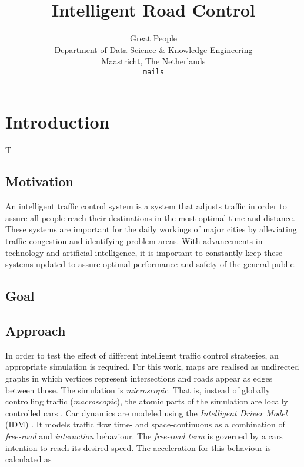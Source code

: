 \documentclass[10pt]{article}
\title{Intelligent Road Control}
\author{Great People \\
	Department of Data Science \& Knowledge Engineering\\
	Maastricht, The Netherlands\\
	{\tt mails}
  }
\begin{document}
\maketitle

\begin{abstract}
	
\end{abstract}

\section{Introduction}
T

\subsection{Motivation}
An intelligent traffic control system is a system that adjusts traffic in order to assure all people reach their destinations in the most optimal time and distance.  These systems are important for the daily workings of major cities by alleviating traffic congestion and identifying problem areas.  With advancements in technology and artificial intelligence, it is important to constantly keep these systems updated to assure optimal performance and safety of the general public.

\subsection{Goal}

\subsection{Approach}
In order to test the effect of different intelligent traffic control strategies, an appropriate simulation is required. For this work, maps are realised as undirected graphs in which vertices represent intersections and roads appear as edges between those. The simulation is \textit{microscopic}. That is, instead of globally controlling traffic (\textit{macroscopic}), the atomic parts of the simulation are locally controlled cars \citep[see also][]{krajzewicz2002sumo}. Car dynamics are modeled using the \textit{Intelligent Driver Model} (IDM) \citep{treiber2000congested}. It models traffic flow time- and space-continuous as a combination of \textit{free-road} and \textit{interaction} behaviour. The \textit{free-road term} is governed by a cars intention to reach its desired speed. The acceleration for this behaviour is calculated \citep{treiber2000congested} as
\end{document}
